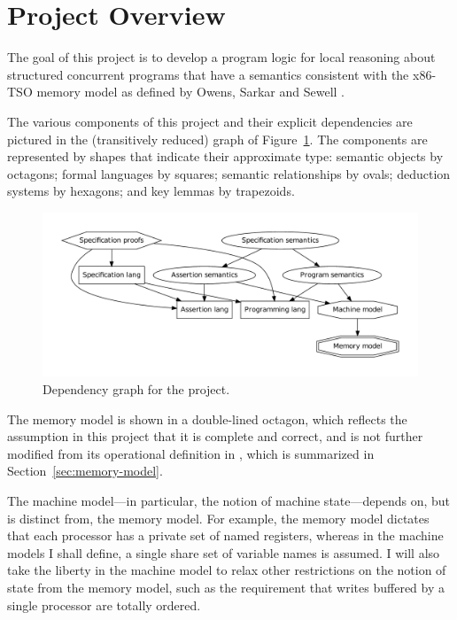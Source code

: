 \documentclass[11pt]{article}
\begin{document}
\section{Project Overview}

The goal of this project is to develop a program logic for local reasoning about structured concurrent programs that have a semantics consistent with the x86-TSO memory model as defined by Owens, Sarkar and Sewell \cite{DBLP:conf/tphol/OwensSS09}. 

The various components of this project and their explicit dependencies are pictured in the (transitively reduced) graph of Figure~\ref{fig:dependency-graph}. The components are represented by shapes that indicate their approximate type: semantic objects by octagons; formal languages by squares; semantic relationships by ovals; deduction systems by hexagons; and key lemmas by trapezoids. 

\begin{figure}[ht]
\begin{center}
\includegraphics[scale=0.5]{dependency-graph/dg-reduced}
\caption{\label{fig:dependency-graph}Dependency graph for the project.}
\end{center}
\end{figure}

The memory model is shown in a double-lined octagon, which reflects the assumption in this project that it is complete and correct, and is not further modified from its operational definition in \cite{DBLP:conf/tphol/OwensSS09}, which is summarized in Section~\ref{sec:memory-model}. 

The machine model---in particular, the notion of machine state---depends on, but is distinct from, the memory model. For example, the memory model dictates that each processor has a private set of named registers, whereas in the machine models I shall define, a single share set of variable names is assumed. I will also take the liberty in the machine model to relax other restrictions on the notion of state from the memory model, such as the requirement that writes buffered by a single processor are totally ordered. 
\end{document}
